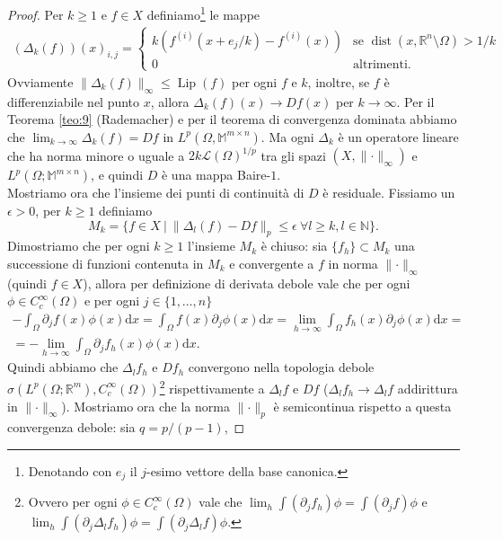 \documentclass[a4paper,11pt]{book}
\theoremstyle{plain}
\theoremstyle{definition}
\theoremstyle{remark}
\newcommand{\R}{\mathbb{R}}
\newcommand{\N}{\mathbb{N}}
\newcommand{\M}{\mathbb{M}}
\newcommand{\LL}{\mathscr{L}}
\newcommand{\norm}[1]{\lVert#1\rVert}
\newcommand{\dx}{\text{d}x}
\DeclareMathOperator{\dist}{dist}
\DeclareMathOperator{\Lip}{Lip}
\begin{document}
\begin{proof}
	Per $k\geq 1$ e $f\in X$ definiamo\footnote{Denotando con $e_j$ il $j$-esimo vettore della base canonica.} le mappe
	\begin{align*}
        (\Delta_k(f))(x)_{i,j} = \begin{cases}
                                 	k(f^{(i)}(x+e_j/k)-f^{(i)}(x)) &\text{se }\dist(x,\R^n\setminus\Omega)>1/k\\
                                 	0&\text{altrimenti}.
                                 \end{cases}
	\end{align*}
    Ovviamente $\norm{\Delta_k(f)}_{\infty}\leq \Lip(f)$ per ogni $f$ e $k$, inoltre, se $f$ è differenziabile nel punto $x$, allora $\Delta_k(f)(x)\to Df(x)$ per $k\to\infty$. Per il Teorema \ref{teo:9} (Rademacher) e per il teorema di convergenza dominata abbiamo che $\lim_{k\to\infty}\Delta_k(f) = Df$ in $L^p(\Omega,\M^{m\times n})$. Ma ogni $\Delta_k$ è un operatore lineare che ha norma minore o uguale a $2k\LL(\Omega)^{1/p}$ tra gli spazi $(X,\norm{\cdot}_{\infty})$ e $L^p(\Omega;\M^{m\times n})$, e quindi $D$ è una mappa Baire-$1$.\\
    Mostriamo ora che l'insieme dei punti di continuità di $D$ è residuale. Fissiamo un $\epsilon > 0$, per $k\geq 1$ definiamo
    \[
        M_k=\{f\in X\ |\ \norm{\Delta_l(f)-Df}_p\leq \epsilon\ \forall l\geq k, l\in\N\}.
    \]
    Dimostriamo che per ogni $k\geq 1$ l'insieme $M_{k}$ è chiuso: sia $\{f_{h}\}\subset M_{k}$ una successione di funzioni contenuta in $M_{k}$ e convergente a $f$ in norma $\norm{\cdot}_{\infty}$ (quindi $f\in X$), allora per definizione di derivata debole vale che per ogni $\phi\in C^{\infty}_{c}(\Omega)$ e per ogni $j\in\{1,\ldots,n\}$
    \begin{multline*}%
		-\int_{\Omega}\partial_{j}f(x)\phi(x)\dx = \int_{\Omega} f(x)\partial_{j}\phi(x)\dx = \lim_{h\to\infty}\int_{\Omega} f_{h}(x)\partial_{j}\phi(x)\dx=\\=-\lim_{h\to\infty}\int_{\Omega}\partial_{j}f_{h}(x)\phi(x)\dx.
    \end{multline*}
    Quindi abbiamo che $\Delta_{l}f_{h}$ e $Df_{h}$ convergono nella topologia debole $\sigma(L^{p}(\Omega;\R^{m}),C^{\infty}_{c}(\Omega))$\footnote{Ovvero per ogni $\phi\in C^{\infty}_{c}(\Omega)$ vale che $\displaystyle\lim_{h}\int(\partial_{j}f_{h})\phi = \int(\partial_{j}f)\phi$ e $\displaystyle\lim_{h}\int(\partial_{j}\Delta_{l}f_{h})\phi = \int(\partial_{j}\Delta_{l}f)\phi$.} rispettivamente a $\Delta_{l}f$ e $Df$ ($\Delta_{l}f_{h}\to\Delta_{l}f$ addirittura in $\norm{\cdot}_{\infty}$). Mostriamo ora che la norma $\norm{\cdot}_{p}$ è semicontinua rispetto a questa convergenza debole: sia $q=p/(p-1)$, 

\end{proof}
\end{document}
